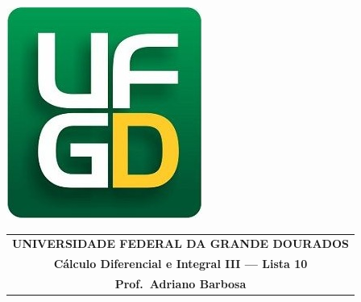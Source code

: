 \documentclass[a4paper,5pt]{amsbook}
\begin{document}
\thispagestyle{empty}
\pagestyle{empty}
\begin{minipage}[h]{0.14\textwidth}
	\includegraphics[scale=0.24]{../../ufgd.png}
\end{minipage}
\begin{minipage}[h]{\textwidth}
\begin{tabular}{c}
{{\bf UNIVERSIDADE FEDERAL DA GRANDE DOURADOS}}\\
{{\bf C\'alculo Diferencial e Integral III --- Lista 10}}\\
{{\bf Prof.\ Adriano Barbosa}}\\
\end{tabular}
\vspace{-0.45cm}
%
\end{minipage}

\end{document}
